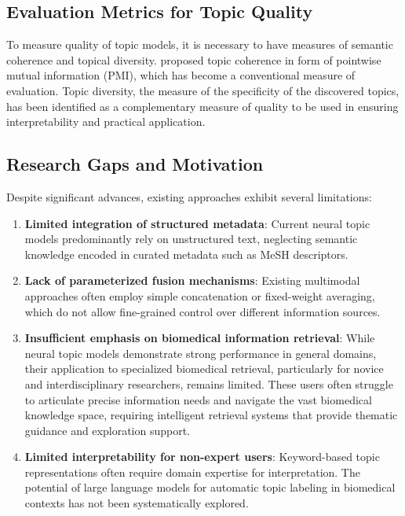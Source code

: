 \documentclass[utf8]{FrontiersinHarvard}
\begin{document}
\subsection{Evaluation Metrics for Topic Quality}

To measure quality of topic models, it is necessary to have measures of semantic coherence and topical diversity. \citet{mimno_optimizing_2011} proposed topic coherence in form of pointwise mutual information (PMI), which has become a conventional measure of evaluation. Topic diversity, the measure of the specificity of the discovered topics, has been identified as a complementary measure of quality to be used in ensuring interpretability and practical application.

\subsection{Research Gaps and Motivation}

Despite significant advances, existing approaches exhibit several limitations:

\begin{enumerate}[leftmargin=*,label=\arabic*)]
    \item \textbf{Limited integration of structured metadata}: Current neural topic models predominantly rely on unstructured text, neglecting semantic knowledge encoded in curated metadata such as MeSH descriptors.

    \item \textbf{Lack of parameterized fusion mechanisms}: Existing multimodal approaches often employ simple concatenation or fixed-weight averaging, which do not allow fine-grained control over different information sources.

    \item \textbf{Insufficient emphasis on biomedical information retrieval}: While neural topic models demonstrate strong performance in general domains, their application to specialized biomedical retrieval, particularly for novice and interdisciplinary researchers, remains limited. These users often struggle to articulate precise information needs and navigate the vast biomedical knowledge space, requiring intelligent retrieval systems that provide thematic guidance and exploration support.

    \item \textbf{Limited interpretability for non-expert users}: Keyword-based topic representations often require domain expertise for interpretation. The potential of large language models for automatic topic labeling in biomedical contexts has not been systematically explored.
\end{enumerate}
\end{document}
